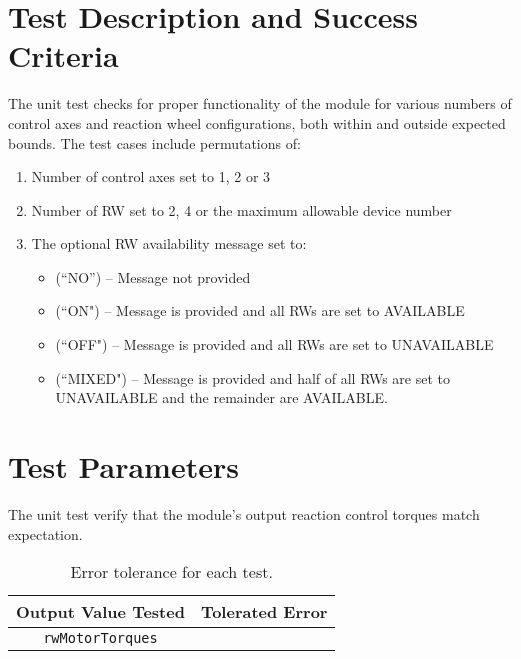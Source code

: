 
\section{Test Description and Success Criteria}
The unit test checks for proper functionality of the module for various numbers of control axes and reaction wheel configurations, both within and outside expected bounds. The  test cases  include permutations of:
\begin{enumerate}
\item Number of control axes set to 1, 2 or 3
\item Number of RW set to 2, 4 or the maximum allowable device number
\item The optional RW availability message set to:
\begin{itemize}
\item(``NO'') -- Message not provided
\item (``ON") -- Message is provided and all RWs are set to AVAILABLE
\item (``OFF") -- Message is provided and all RWs are set to UNAVAILABLE
\item (``MIXED") -- Message is provided and half of all RWs are set to UNAVAILABLE and the remainder are AVAILABLE.
\end{itemize}
\end{enumerate}


\section{Test Parameters}

The unit test verify that the module's output reaction control torques match expectation.
\begin{table}[htbp]
	\caption{Error tolerance for each test.}
	\label{tab:errortol}
	\centering \fontsize{10}{10}\selectfont
	\begin{tabular}{ c | c } %
		\hline\hline
		\textbf{Output Value Tested}  & \textbf{Tolerated Error}  \\ 
		\hline
		{\tt rwMotorTorques}        & 	   \\ 
		\hline\hline
	\end{tabular}
\end{table}




